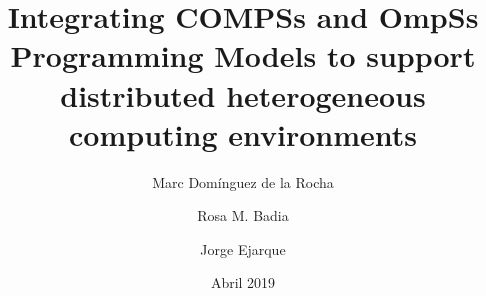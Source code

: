 \documentclass[a4paper]{article}
\title{Integrating COMPSs and OmpSs Programming Models to support distributed heterogeneous computing environments}
\author
{
Marc Domínguez de la Rocha
\and
Rosa M. Badia
\and
Jorge Ejarque
}
\date{Abril 2019}
\begin{document}
\maketitle

\newpage
\renewcommand{\contentsname}{Índice}
\tableofcontents
\newpage





\appendixpage
\appendix

\newpage

\newpage

\newpage

\newpage



\nocite{*}
\end{document}

